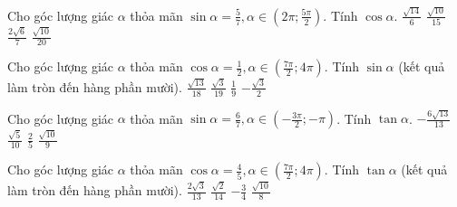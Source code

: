 \documentclass[12pt,a4paper]{article}
\begin{document}
\begin{ex}
 Cho góc lượng giác $\alpha$ thỏa mãn $\sin \alpha=\frac{5}{7}, \alpha \in \left( 2\pi;\frac{5 \pi}{2} \right)$. Tính $\cos\alpha$. 
\choice
{ ${\frac{\sqrt{14}}{6}}$ }
   { ${\frac{\sqrt{10}}{15}}$ }
     { \True ${\frac{2 \sqrt{6}}{7}}$ }
    { ${\frac{\sqrt{10}}{20}}$ }
\end{ex}

\begin{ex}
 Cho góc lượng giác $\alpha$ thỏa mãn $\cos \alpha=\frac{1}{2}, \alpha \in \left( \frac{7 \pi}{2}; 4\pi \right)$. Tính $\sin\alpha$ (kết quả làm tròn đến hàng phần mười). 
\choice
{ ${\frac{\sqrt{13}}{18}}$ }
   { ${\frac{\sqrt{3}}{19}}$ }
     { ${\frac{1}{9}}$ }
    { \True ${- \frac{\sqrt{3}}{2}}$ }
\end{ex}

\begin{ex}
 Cho góc lượng giác $\alpha$ thỏa mãn $\sin \alpha=\frac{6}{7}, \alpha \in \left( - \frac{3 \pi}{2};- \pi \right)$. Tính $\tan\alpha$. 
\choice
{ \True $- \frac{6 \sqrt{13}}{13}$ }
   { $\frac{\sqrt{5}}{10}$ }
     { $\frac{2}{5}$ }
    { $\frac{\sqrt{10}}{9}$ }
\end{ex}

\begin{ex}
 Cho góc lượng giác $\alpha$ thỏa mãn $\cos \alpha=\frac{4}{5}, \alpha \in \left( \frac{7 \pi}{2}; 4\pi \right)$. Tính $\tan\alpha$ (kết quả làm tròn đến hàng phần mười). 
\choice
{ $\frac{2 \sqrt{3}}{13}$ }
   { $\frac{\sqrt{2}}{14}$ }
     { \True $- \frac{3}{4}$ }
    { $\frac{\sqrt{10}}{8}$ }
\end{ex}
\end{document}
